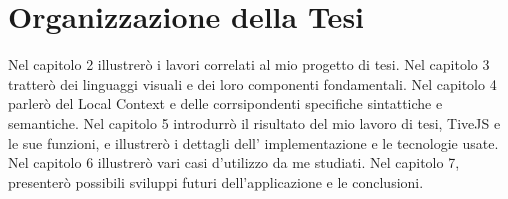     \section{Organizzazione della Tesi}
        Nel capitolo 2 illustrerò i lavori correlati al mio progetto di tesi.
        Nel capitolo 3 tratterò dei linguaggi visuali e dei loro componenti fondamentali. Nel capitolo 4 parlerò del Local Context e delle corrsipondenti specifiche sintattiche e semantiche. Nel capitolo 5 introdurrò il risultato del mio lavoro di tesi, TiveJS e le sue funzioni, e illustrerò  i dettagli dell' implementazione e le tecnologie usate. Nel capitolo 6 illustrerò vari casi d'utilizzo da me studiati. Nel capitolo 7, presenterò possibili sviluppi futuri dell'applicazione e le conclusioni.
